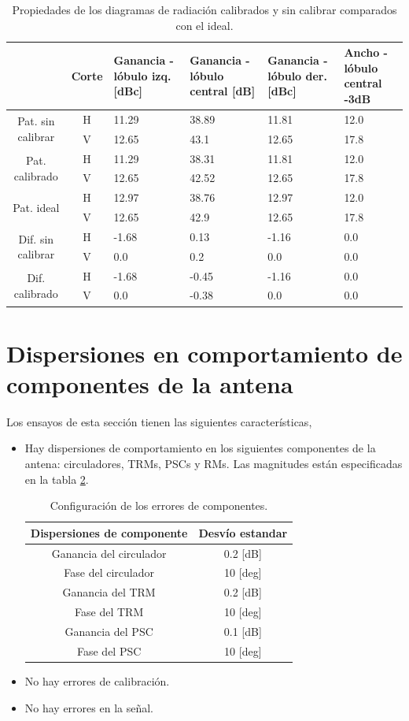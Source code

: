 \begin{table}[H]
  \footnotesize
  \centering
  \begin{tabular}{|c|c|p{2cm}|p{2.5cm}|p{2.5cm}|p{2.5cm}|}
    \cline{2-6}
    \multicolumn{1}{c|}{} & Corte & Ganancia - lóbulo izq. [dBc] & Ganancia - lóbulo central [dB] &
    Ganancia - lóbulo der. [dBc] & Ancho - lóbulo central -3dB \tabularnewline\hline
    \multirow{2}{2cm}{Pat. sin calibrar} & H & 11.29 & 38.89 & 11.81 & 12.0 \tabularnewline\cline{2-6}
     & V & 12.65 & 43.1 & 12.65 & 17.8 \tabularnewline\hline
    \multirow{2}{2cm}{Pat. calibrado} & H & 11.29 & 38.31 & 11.81 & 12.0 \tabularnewline\cline{2-6}
     & V & 12.65 & 42.52 & 12.65 & 17.8 \tabularnewline\hline
    \multirow{2}{2cm}{Pat. ideal} & H & 12.97 & 38.76 & 12.97 & 12.0 \tabularnewline\cline{2-6}
     & V & 12.65 & 42.9 & 12.65 & 17.8 \tabularnewline\hline
    \multirow{2}{2cm}{Dif. sin calibrar} & H & -1.68 & 0.13 & -1.16 & 0.0\tabularnewline\cline{2-6}
     & V & 0.0 & 0.2 & 0.0 & 0.0 \tabularnewline\hline
    \multirow{2}{2cm}{Dif. calibrado} & H & -1.68 & -0.45 & -1.16 & 0.0 \tabularnewline\cline{2-6}
     & V & 0.0 & -0.38 & 0.0 & 0.0 \tabularnewline\hline
  \end{tabular}
  \caption{Propiedades de los diagramas de radiación calibrados y sin calibrar comparados con el ideal.}
  \label{tab:deadTRMsMutual10degRow}
\end{table}


\section{Dispersiones en comportamiento de componentes de la antena}

Los ensayos de esta sección tienen las siguientes características,
\begin{itemize}
	\item Hay dispersiones de comportamiento en los siguientes componentes de la antena: circuladores, TRMs, PSCs y RMs. Las 
		magnitudes están especificadas en la tabla \ref{tab:errorReferences}.
		\begin{table}[H]
		  \footnotesize
		  \centering
		  \begin{tabular}{|c|c|}
			\hline
			\textbf{Dispersiones de componente} & \textbf{Desvío estandar} \tabularnewline \hline 
			Ganancia del circulador &  0.2 [dB] \tabularnewline\hline 
			Fase del circulador &  10 [deg] \tabularnewline\hline 
			Ganancia del TRM &  0.2 [dB] \tabularnewline\hline 
			Fase del TRM &  10 [deg] \tabularnewline\hline 
			Ganancia del PSC &  0.1 [dB] \tabularnewline\hline 
			Fase del PSC &  10 [deg] \tabularnewline\hline 
		  \end{tabular}
		  \caption{Configuración de los errores de componentes.}
		  \label{tab:errorReferences}
		\end{table}
	\item No hay errores de calibración.
	\item No hay errores en la señal.
\end{itemize}

